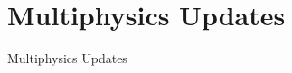 \documentclass[8pt,xcolor=dvipnames]{beamer}
\begin{document}
\section{Multiphysics Updates}


\begin{frame}{Multiphysics Updates}

\tableofcontents[currentsection]

\end{frame}
\end{document}
